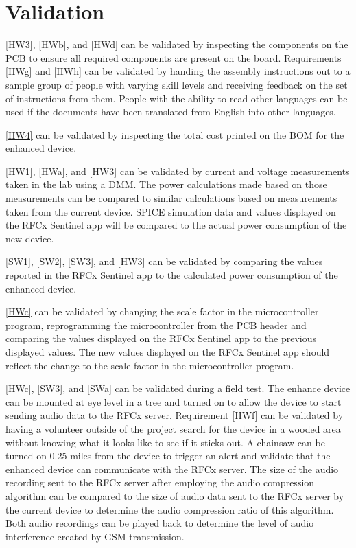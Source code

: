 \documentclass{article}
\numberwithin{figure}{section}
\numberwithin{equation}{section}
\begin{document}
{\section{Validation} \label{sect:validation}
\ref{HW3}, \ref{HWb}, and \ref{HWd} can be validated by inspecting the components on the PCB to ensure all required components are present on the board. Requirements \ref{HWg} and \ref{HWh} can be validated by handing the assembly instructions out to a sample group of people with varying skill levels and receiving feedback on the set of instructions from them. People with the ability to read other languages can be used if the documents have been translated from English into other languages.

\ref{HW4} can be validated by inspecting the total cost printed on the BOM for the enhanced device.

\ref{HW1}, \ref{HWa}, and \ref{HW3} can be validated by current and voltage measurements taken in the lab using a DMM. The power calculations made based on those measurements can be compared to similar calculations based on measurements taken from the current device. SPICE simulation data and values displayed on the RFCx Sentinel app will be compared to the actual power consumption of the new device.

\ref{SW1}, \ref{SW2}, \ref{SW3}, and \ref{HW3} can be validated by comparing the values reported in the RFCx Sentinel app to the calculated power consumption of the enhanced device.

\ref{HWc} can be validated by changing the scale factor in the microcontroller program, reprogramming the microcontroller from the PCB header and comparing the values displayed on the RFCx Sentinel app to the previous displayed values. The new values displayed on the RFCx Sentinel app should reflect the change to the scale factor in the microcontroller program.

\ref{HWc}, \ref{SW3}, and \ref{SWa} can be validated during a field test. The enhance device can be mounted at eye level in a tree and turned on to allow the device to start sending audio data to the RFCx server. Requirement \ref{HWf} can be validated by having a volunteer outside of the project search for the device in a wooded area without knowing what it looks like to see if it sticks out. A chainsaw can be turned on 0.25 miles from the device to trigger an alert and validate that the enhanced device can communicate with the RFCx server. The size of the audio recording sent to the RFCx server after employing the audio compression algorithm can be compared to the size of audio data sent to the RFCx server by the current device to determine the audio compression ratio of this algorithm. Both audio recordings can be played back to determine the level of audio interference created by GSM transmission.

}
\end{document}
